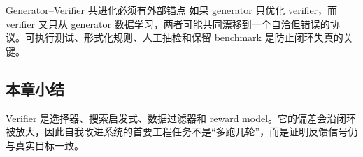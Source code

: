 \begin{importantbox}{Generator--Verifier 共进化必须有外部锚点}
如果 generator 只优化 verifier，而 verifier 又只从 generator 数据学习，两者可能共同漂移到一个自洽但错误的协议。可执行测试、形式化规则、人工抽检和保留 benchmark 是防止闭环失真的关键。
\end{importantbox}

\subsection{本章小结}

Verifier 是选择器、搜索启发式、数据过滤器和 reward model。它的偏差会沿闭环被放大，因此自我改进系统的首要工程任务不是“多跑几轮”，而是证明反馈信号仍与真实目标一致。

